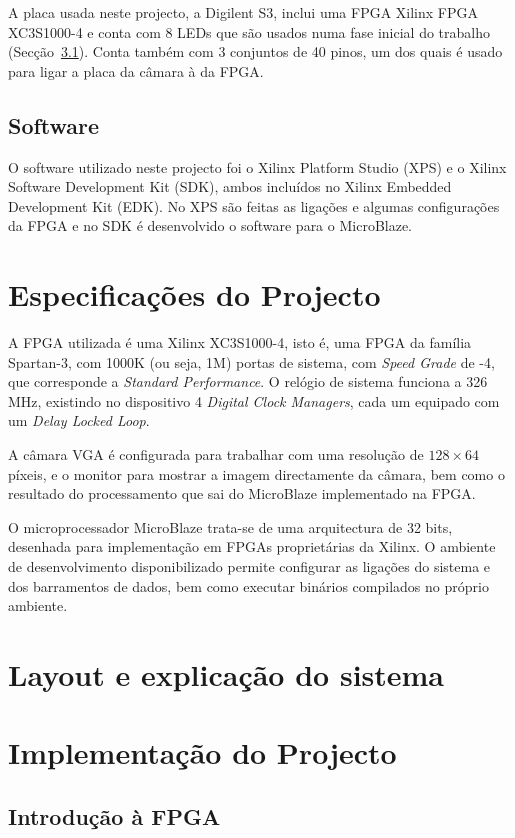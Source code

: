 \documentclass[a4paper,12pt]{article}
\begin{document}
A placa usada neste projecto, a Digilent S3,  inclui uma FPGA Xilinx FPGA XC3S1000-4 e conta com 8 LEDs que são usados numa fase inicial do trabalho (Secção~\ref{subsec:LEDs}). Conta também com 3 conjuntos de 40 pinos, um dos quais é usado para ligar a placa da câmara à da FPGA.

\subsection*{Software}
O software utilizado neste projecto foi o Xilinx Platform Studio (XPS) e o Xilinx Software Development Kit (SDK), ambos incluídos no Xilinx Embedded Development Kit (EDK). No XPS são feitas as ligações e algumas configurações da FPGA e no SDK é desenvolvido o software para o MicroBlaze.

\section{Especificações do Projecto}

A FPGA utilizada é uma Xilinx XC3S1000-4, isto é, uma FPGA da família Spartan-3, com 1000K (ou seja, 1M) portas de sistema, com \textit{Speed Grade} de -4, que corresponde a \textit{Standard Performance}. O relógio de sistema funciona a 326 MHz, existindo no dispositivo 4 \textit{Digital Clock Managers}, cada um equipado com um \textit{Delay Locked Loop}\cite{bib:s3datasheet}.

A câmara VGA é configurada para trabalhar com uma resolução de $128\times64$ píxeis, e o monitor para mostrar a imagem directamente da câmara, bem como o resultado do processamento que sai do MicroBlaze implementado na FPGA.

O microprocessador MicroBlaze trata-se de uma arquitectura de 32 bits, desenhada para implementação em FPGAs proprietárias da Xilinx\textregistered\cite{bib:microblaze}. O ambiente de desenvolvimento disponibilizado permite configurar as ligações do sistema e dos barramentos de dados, bem como executar binários compilados no próprio ambiente.

\section{Layout e explicação do sistema}


\section{Implementação do Projecto}
\subsection{Introdução à FPGA}
\label{subsec:LEDs}
\end{document}
